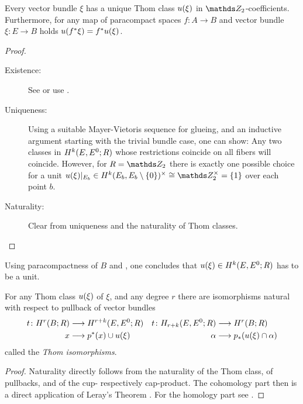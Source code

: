\begin{Thm}
  Every vector bundle $\xi$ has a unique Thom class $u(\xi)$ in
  $\Zmod2$-coefficients.
  Furthermore, for any map of paracompact spaces $f\colon A\to B$ and
  vector bundle $\xi\colon E\to B$ holds $u({f}^* \xi) = {f}^* u(\xi)$.
  \begin{proof}
    \begin{description}
    \item[Existence:] See \cite[Theorem~4D.10]{hatcher} or use
      \cite[Proposition~17.9.3]{tomdieck}.
    \item[Uniqueness:] %
      Using a suitable Mayer-Vietoris sequence for glueing, and an
      inductive argument starting with the trivial bundle case, one can show:
      Any two classes in $H^{k}(E, {E}^0;R)$ whose
      restrictions coincide on all fibers will coincide.
      However, for $R=\Zmod2$ there is exactly one possible choice for
      a unit $\u(\xi)|_{E_b}\in
      H^{\rkk}(\spherepair{E_b})^\times\cong\Zmod2^\times=\{1\}$
      over each point $b$.
    \item[Naturality:] Clear from uniqueness and the naturality of Thom classes.
    \end{description}
  \end{proof}
\end{Thm}

\begin{Rem}
  Using paracompactness of $B$ and
  \cite[Proposition~17.9.6]{tomdieck}, one concludes that
  $u(\xi)\in H^{k}(E, {E}^0;R)$ has to be a unit.
\end{Rem}

\begin{Thm}
  For any Thom class $u(\xi)$ of $\xi$, and any degree $r$ there are
  isomorphisms natural with respect to pullback of vector bundles
  \begin{align*}
    t\colon
    H^r(B;R) &\longrightarrow H^{r+k}(E, {E}^0; R)
    & t\colon
      H_{r+k}(E, {E}^0; R) &\longrightarrow H^r(B;R)
    \\
    x &\longrightarrow {p}^* (x) \cup u(\xi)
    & \alpha &\longrightarrow {p}_* (u(\xi) \cap \alpha)
  \end{align*}
  called the \emph{Thom isomorphisms}.
  \begin{proof}
    Naturality directly follows from the naturality of the Thom class,
    of pullbacks, and of the cup- respectively cap-product.
    The cohomology part then is a direct application of Leray's Theorem
    \cite[Theorem~4D.8]{hatcher}.
    For the homology part see \forexample \cite[Theorem~14.6]{switzer}.
  \end{proof}
\end{Thm}

